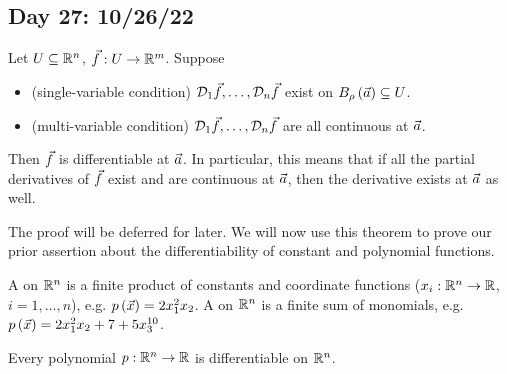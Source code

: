 \documentclass[main.tex]{subfiles}
\begin{document}
\subsection{Day 27: 10/26/22}

\begin{theorem}
    Let $U\subseteq \mathbb R^n$, $\vec{f} : U \to \mathbb R^m$. Suppose
    \begin{itemize}
        \item (single-variable condition) $\mathcal{D}_1\vec{f}, \ldots , \mathcal{D}_n\vec{f}$ exist on $B_\rho\left( \vec{a} \right)\subseteq U$.
        \item (multi-variable condition) $\mathcal{D}_1\vec{f}, \ldots , \mathcal{D}_n\vec{f}$ are all continuous at $\vec{a}$.
    \end{itemize}
    Then $\vec{f}$ is differentiable at $\vec{a}$. In particular, this means that if all the partial derivatives of $\vec{f}$ exist and are continuous at $\vec{a}$, then the derivative exists at $\vec{a}$ as well.
\end{theorem}

The proof will be deferred for later. We will now use this theorem to prove our prior assertion about the differentiability of constant and polynomial functions.

\begin{definition}
    A  on $\mathbb R^n$ is a finite product of constants and coordinate functions ($x_i : \mathbb R^n \to \mathbb R$, $i = 1, \ldots , n$), e.g. $p\left( \vec{x} \right) = 2x_1^2x_2$. A  on $\mathbb R^n$ is a finite sum of monomials, e.g. $p\left( \vec{x} \right) = 2x_1^2x_2 + 7 + 5x_3^{10}$.
\end{definition}

\begin{theorem}
    Every polynomial $p : \mathbb R^n \to \mathbb R$ is differentiable on $\mathbb R^n$.
\end{theorem}
\end{document}
